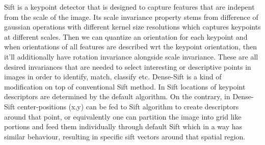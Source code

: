\documentclass[12pt]{article}
\begin{document}
    \vspace*{0.5cm}
    \begin{center}
        \raggedright
        Sift is a keypoint detector that is designed to capture features that are indepent from the scale of the image.
        Its scale invariance property stems from difference of gaussian operations with different kernel size resolutions which captures keypoints at different scales.
        Then we can quantize an orientation for each keypoint and when orientations of all features are described wrt the keypoint orientation, then it'll additionally have rotation invariance alongside scale invariance.
        These are all desired invariances that are needed to select interesting or descriptive points in images in order to identify, match, classify etc.
        Dense-Sift is a kind of modification on top of conventional Sift method. In Sift locations of keypoint descriptors are determined by the default algorithm.
        On the contrary, in Dense-Sift center-positions (x,y) can be fed to Sift algorithm to create descriptors around that point, or equivalently one can partition the image into grid like portions 
        and feed them individually through default Sift which in a way has similar behaviour, resulting in specific sift vectors around that spatial region.
    \end{center}
    
\end{document}
